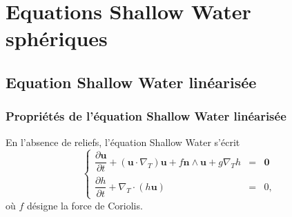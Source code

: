 \chapter{Equations Shallow Water sphériques}

\section{Equation Shallow Water linéarisée}

\subsection{Propriétés de l'équation Shallow Water linéarisée}

En l'absence de reliefs, l'équation Shallow Water s'écrit
\begin{equation}
\label{eq:SWE_without relief}
\left\lbrace
\begin{array}{rcl}
\dfrac{\partial \mathbf{u}}{\partial t} + \left( \mathbf{u} \cdot \nabla_T \right) \mathbf{u} + f \mathbf{n} \wedge \mathbf{u} + g \nabla_T h & = & \mathbf{0} \\
\dfrac{\partial h}{\partial t} + \nabla_T \cdot \left( h \mathbf{u} \right) & = & 0,
\end{array}
\right.
\end{equation}
où $f$ désigne la force de Coriolis.

